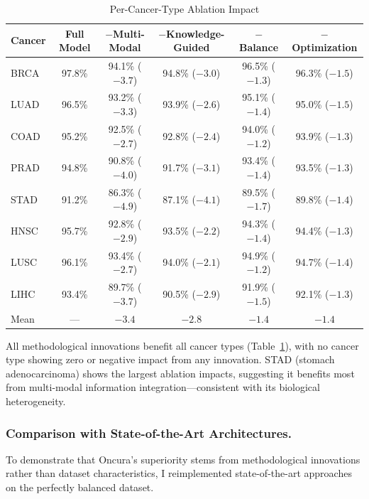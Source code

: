 \documentclass[manuscript, screen, review]{jair}
\begin{document}
\begin{table}[!t]
  \caption{Per-Cancer-Type Ablation Impact}
  \label{tab:percancer}
  \centering
  \small
  \begin{tabular}{lccccc}
    \toprule
    Cancer & Full Model & $-$Multi-Modal & $-$Knowledge-Guided & $-$Balance & $-$Optimization \\
    \midrule
    BRCA & 97.8\% & 94.1\% ($-3.7$) & 94.8\% ($-3.0$) & 96.5\% ($-1.3$) & 96.3\% ($-1.5$) \\
    LUAD & 96.5\% & 93.2\% ($-3.3$) & 93.9\% ($-2.6$) & 95.1\% ($-1.4$) & 95.0\% ($-1.5$) \\
    COAD & 95.2\% & 92.5\% ($-2.7$) & 92.8\% ($-2.4$) & 94.0\% ($-1.2$) & 93.9\% ($-1.3$) \\
    PRAD & 94.8\% & 90.8\% ($-4.0$) & 91.7\% ($-3.1$) & 93.4\% ($-1.4$) & 93.5\% ($-1.3$) \\
    STAD & 91.2\% & 86.3\% ($-4.9$) & 87.1\% ($-4.1$) & 89.5\% ($-1.7$) & 89.8\% ($-1.4$) \\
    HNSC & 95.7\% & 92.8\% ($-2.9$) & 93.5\% ($-2.2$) & 94.3\% ($-1.4$) & 94.4\% ($-1.3$) \\
    LUSC & 96.1\% & 93.4\% ($-2.7$) & 94.0\% ($-2.1$) & 94.9\% ($-1.2$) & 94.7\% ($-1.4$) \\
    LIHC & 93.4\% & 89.7\% ($-3.7$) & 90.5\% ($-2.9$) & 91.9\% ($-1.5$) & 92.1\% ($-1.3$) \\
    \midrule
    Mean & --- & $-3.4$ & $-2.8$ & $-1.4$ & $-1.4$ \\
    \bottomrule
  \end{tabular}
\end{table}

All methodological innovations benefit all cancer types (Table~\ref{tab:percancer}), with no cancer type showing zero or negative impact from any innovation. STAD (stomach adenocarcinoma) shows the largest ablation impacts, suggesting it benefits most from multi-modal information integration---consistent with its biological heterogeneity.

\subsubsection{Comparison with State-of-the-Art Architectures.}
\label{sec:comparison}

To demonstrate that Oncura's superiority stems from methodological innovations rather than dataset characteristics, I reimplemented state-of-the-art approaches on the perfectly balanced dataset.
\end{document}

